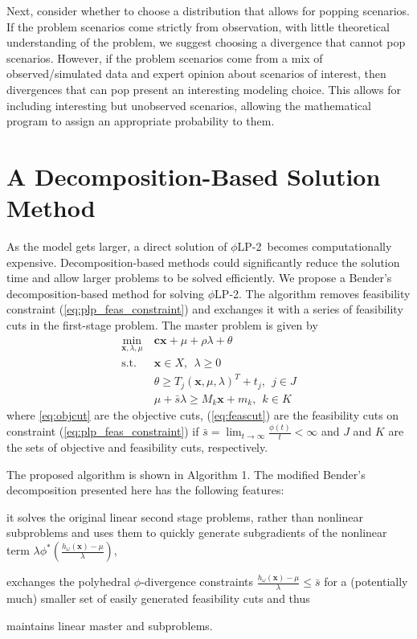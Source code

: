 \documentclass[opre,nonblindrev]{informs3} %
\newcommand{\x}{\mathbf{x}}
\renewcommand{\c}{\mathbf{c}}
\newcommand{\st}{\mbox{s.t.}}
\newcommand{\plp}{$\phi$LP-2}
\begin{document}
Next, consider whether to choose a distribution that allows for popping scenarios.
If the problem scenarios come strictly from observation, with little theoretical understanding of the problem, we suggest choosing a divergence that cannot pop scenarios.
However, if the problem scenarios come from a mix of observed/simulated data and expert opinion about scenarios of interest, then divergences that can pop present an interesting modeling choice.
This allows for including interesting but unobserved scenarios, allowing the mathematical program to assign an appropriate probability to them.


\section{A Decomposition-Based Solution Method}
\label{sec:soln_algorithm}

As the model gets larger, a direct solution of \plp\ becomes computationally expensive. 
Decomposition-based methods could significantly reduce the solution time and allow larger problems to be solved efficiently. We propose a Bender's decomposition-based method for solving \plp.
The algorithm removes feasibility constraint (\ref{eq:plp_feas_constraint})  and exchanges it with a series of feasibility cuts in the first-stage problem.
The master problem is given by
\begin{align}
	\min_{\x,\lambda,\mu} \ & \c\x + \mu + \rho \lambda + \theta \label{eq:master_problem}\\
	\st \ & \x \in X,\ \ \lambda \geq 0 \nonumber  \\
	& \theta \geq T_j (\x,\mu,\lambda)^T + t_j, \ \  j \in J  \label{eq:objcut} \\
	& \mu + \bar{s}\lambda \geq M_k \x + m_k, \ \ k \in K \label{eq:feascut} 
\end{align}
where \eqref{eq:objcut} are the objective cuts, (\ref{eq:feascut}) are the feasibility cuts on constraint (\ref{eq:plp_feas_constraint}) if $\bar{s} = \lim_{t \rightarrow \infty} \frac{\phi(t)}{t} < \infty$ and $J$ and $K$ are the sets of objective and feasibility cuts, respectively.

The proposed algorithm is shown in Algorithm 1. 
The modified Bender's decomposition presented here has the following features:
\begin{inparaenum}
	\item it solves the original linear second stage problems, rather than nonlinear subproblems and uses them to quickly generate subgradients of the nonlinear term $\lambda \phi^*\left(\tfrac{h_\omega(\x) - \mu}{\lambda}\right)$, 
	\item exchanges the polyhedral $\phi$-divergence constraints $\tfrac{h_\omega(\x) - \mu}{\lambda} \leq \bar{s}$ for a (potentially much) smaller set of easily generated feasibility cuts and thus
	\item  maintains linear master and subproblems.\medskip
\end{inparaenum}
\end{document}
